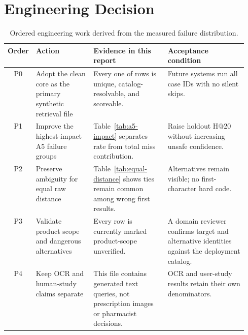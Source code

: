 \documentclass[11pt,a4paper]{article}
\begin{document}
\section{Engineering Decision}

\begin{table}[H]
\centering
\small
\begin{tabularx}{\linewidth}{@{}cL{0.24\linewidth}L{0.31\linewidth}Y@{}}
\toprule
\textbf{Order} & \textbf{Action} & \textbf{Evidence in this report} & \textbf{Acceptance condition} \\
\midrule
P0 & Adopt the clean core as the primary synthetic retrieval file & Every one of \DatasetCases{} rows is unique, catalog-resolvable, and scoreable. & Future systems run all case IDs with no silent skips. \\
P1 & Improve the highest-impact A5 failure groups & Table~\ref{tab:a5-impact} separates rate from total miss contribution. & Raise holdout H@20 without increasing unsafe confidence. \\
P2 & Preserve ambiguity for equal raw distance & Table~\ref{tab:equal-distance} shows ties remain common among wrong first results. & Alternatives remain visible; no first-character hard code. \\
P3 & Validate product scope and dangerous alternatives & Every row is currently marked product-scope unverified. & A domain reviewer confirms target and alternative identities against the deployment catalog. \\
P4 & Keep OCR and human-study claims separate & This file contains generated text queries, not prescription images or pharmacist decisions. & OCR and user-study results retain their own denominators. \\
\bottomrule
\end{tabularx}
\caption{Ordered engineering work derived from the measured failure distribution.}
\label{tab:actions}
\end{table}
\end{document}
